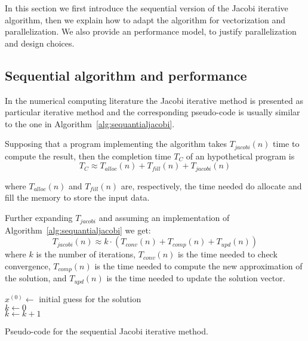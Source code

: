 In this section we first introduce the sequential version of the Jacobi iterative algorithm, then we explain how to adapt the algorithm for vectorization and parallelization.
We also provide an performance model, to justify parallelization and design choices.

\subsection{Sequential algorithm and performance}\label{subsec:seq}
In the numerical computing literature the Jacobi iterative method is presented as particular iterative method and the corresponding pseudo-code is usually similar to the one in Algorithm~\ref{alg:sequantialjacobi}.

Supposing that a program implementing the algorithm takes $T_{jacobi}(n)$ time to compute the result, then the completion time $T_C$ of an hypothetical program is
\[
	T_C \approx T_{alloc}(n) + T_{fill}(n) + T_{jacobi}(n)
\]

where $T_{alloc}(n)$ and $T_{fill}(n)$ are, respectively, the time needed do allocate and fill the memory to store the input data.

Further expanding $T_{jacobi}$ and assuming an implementation of Algorithm~\ref{alg:sequantialjacobi} we get:
\[
	T_{jacobi}(n) \approx k \cdot (T_{conv}(n) + T_{comp}(n) + T_{upd}(n))
\]
where $k$ is the number of iterations, $T_{conv}(n)$ is the time needed to check convergence, $T_{comp}(n)$ is the time needed to compute the new approximation of the solution, and $T_{upd}(n)$ is the time needed to update the solution vector.

\begin{algorithm}[ht]
	\vspace{1em}
	\BlankLine			
	$x^{(0)} \leftarrow $ initial guess for the solution\\
	$k \leftarrow 0$\\
	{
		$k \leftarrow k + 1$\\
	}
\caption{Pseudo-code for the sequential Jacobi iterative method.}
\label{alg:sequantialjacobi}
\end{algorithm}



